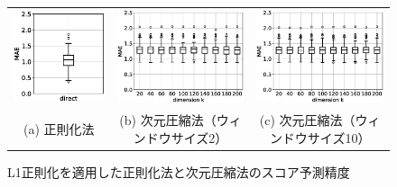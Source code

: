 
\begin{figure}[t]
  \centering
    \begin{tabular}{ccc}
           \includegraphics[width=0.25\hsize]{img/direct-mae-lasso.eps} &
           \includegraphics[width=0.30\hsize]{img/lasso-2.eps} &
           \includegraphics[width=0.30\hsize]{img/lasso-10.eps} \\
           \small  (a) 正則化法& \small  (b) 次元圧縮法（ウィンドウサイズ2） & \small  (c) 次元圧縮法（ウィンドウサイズ10） \\
    \end{tabular}
        \caption{L1正則化を適用した正則化法と次元圧縮法のスコア予測精度}
    \label{lasso}
\end{figure}